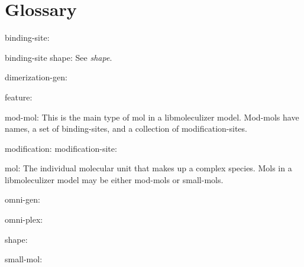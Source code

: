 \chapter{Glossary}

{\bt binding-site: }

{\bt binding-site shape: } See {\it shape}.

{\bt dimerization-gen: } 

{\bt feature: }

{\bt mod-mol: } This is the main type of mol in a libmoleculizer
model.  Mod-mols have names, a set of binding-sites, and a
collection of modification-sites.

{\bt modification: }
{\bt modification-site: }

{\bt mol: } The individual molecular unit that makes up a complex
species.  Mols in a libmoleculizer model may be either mod-mols or
small-mols.

{\bt omni-gen: }

{\bt omni-plex: } 

{\bt shape: } 

{\bt small-mol: }
